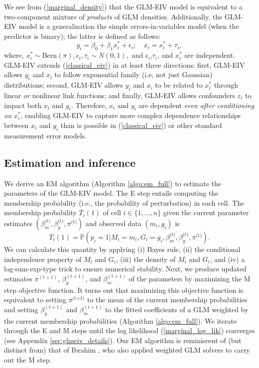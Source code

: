 \documentclass[12pt]{article}
\begin{document}
We see from (\ref{marginal_density}) that the GLM-EIV model is equivalent to a two-component mixture of \textit{products} of GLM densities. Additionally, the GLM-EIV model is a generalization the simple errors-in-variables model (when the predictor is binary); the latter is defined as follows:
\begin{equation}\label{classical_eiv}
y_i = \beta_0 + \beta_1 x^*_i + \epsilon_i; \quad
x_i = x^*_i + \tau_i,
\end{equation}
where, $x^*_i \sim \textrm{Bern}(\pi), \epsilon_i, \tau_i \sim N(0,1),$ and $\epsilon_i$,$\tau_i$, and $x^*_i$ are independent. GLM-EIV extends (\ref{classical_eiv}) in at least three directions: first, GLM-EIV allows $y_i$ and $x_i$ to follow exponential family (i.e, not just Gaussian) distributions; second, GLM-EIV allows $y_i$ and $x_i$ to be related to $x^*_i$ through linear \textit{or} nonlinear link functions; and finally, GLM-EIV allows confounders $z_i$ to impact both $x_i$ and $y_i$. Therefore, $x_i$ and $y_i$ are dependent \textit{even after conditioning on $x^*_i$}, enabling GLM-EIV to capture more complex dependence relationships between $x_i$ and $y_i$ than is possible in (\ref{classical_eiv}) or other standard measurement error models.

\subsection{Estimation and inference}

We derive an EM algorithm (Algorithm \ref{algo:em_full}) to estimate the parameters of the GLM-EIV model. The E step entails computing the membership probability (i.e., the probability of perturbation) in each cell. The membership probability $T_i(1)$ of cell $i \in \{1, \dots, n\}$ given the current parameter estimates $(\beta_m^\textrm{(t)}, \beta_g^\textrm{(t)}, \pi^\textrm{(t)})$ and observed data $(m_i, g_i)$ is
$$T_i(1) = \mathbb{P}(p_i = 1| M_i = m_i, G_i = g_i, \beta^\textrm{(t)}_m, \beta^\textrm{(t)}_g, \pi^\textrm{(t)}).$$ We can calculate this quantity by applying (i) Bayes rule, (ii) the conditional independence property of $M_i$ and $G_i$, (iii) the density of $M_i$ and $G_i$, and (iv) a log-sum-exp-type trick to ensure numerical stability. Next, we produce updated estimates $\pi^{(\textrm{t} +1)}$, $\beta_g^{(\textrm{t}+1)}$, and $\beta_m^{(\textrm{t}+1)}$ of the parameters by maximizing the M step objective function. It turns out that maximizing this objective function is equivalent to setting $\pi^{\textrm{(t+1)}}$ to the mean of the current membership probabilities and setting $\beta_g^{(\textrm{t}+1)}$ and $\beta_m^{(\textrm{t}+1)}$ to the fitted coefficients of a GLM weighted by the current membership probabilities (Algorithm \ref{algo:em_full}). We iterate through the E and M steps until the log likelihood (\ref{marginal_log_lik}) converges (see Appendix \ref{sec:glmeiv_details}). Our EM algorithm is reminiscent of (but distinct from) that of Ibrahim \cite{Ibrahim1990}, who also applied weighted GLM solvers to carry out the M step.
\end{document}
